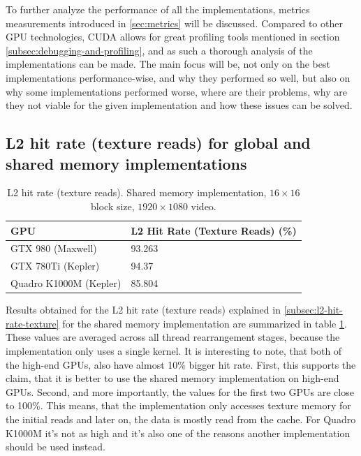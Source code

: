To further analyze the performance of all the implementations, metrics measurements introduced in \ref{sec:metrics} will be discussed. Compared to other GPU technologies, CUDA allows for great profiling tools mentioned in section \ref{subsec:debugging-and-profiling}, and as such a thorough analysis of the implementations can be made. The main focus will be, not only on the best implementations performance-wise, and why they performed so well, but also on why some implementations performed worse, where are their problems, why are they not viable for the given implementation and how these issues can be solved.

\subsection{L2 hit rate (texture reads) for global and shared memory implementations}\label{subsec:l2-hit-rate-prof}

\begin{table}[htbp]
\centering
\begin{tabular}{| l | l |}
\hline
GPU & L2 Hit Rate (Texture Reads) (\%) \\
\hline
GTX 980 (Maxwell) & 93.263 \\
\hline
GTX 780Ti (Kepler) & 94.37 \\
\hline
Quadro K1000M (Kepler) & 85.804 \\
\hline
\end{tabular}
\caption{L2 hit rate (texture reads). Shared memory implementation, $16 \times 16$ block size, $1920 \times 1080$ video.}
\label{tab:l2-hit-rate-shared}
\end{table}

Results obtained for the L2 hit rate (texture reads) explained in \ref{subsec:l2-hit-rate-texture} for the shared memory implementation are summarized in table \ref{tab:l2-hit-rate-shared}. These values are averaged across all thread rearrangement stages, because the implementation only uses a single kernel. It is interesting to note, that both of the high-end GPUs, also have almost 10\% bigger hit rate. First, this supports the claim, that it is better to use the shared memory implementation on high-end GPUs. Second, and more importantly, the values for the first two GPUs are close to 100\%. This means, that the implementation only accesses texture memory for the initial reads and later on, the data is mostly read from the cache. For Quadro K1000M it's not as high and it's also one of the reasons another implementation should be used instead.

